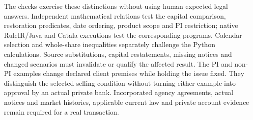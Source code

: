 The checks exercise these distinctions without using human expected legal
answers. Independent mathematical relations test the capital comparison,
restoration predicates, date ordering, product scope and PI restriction;
native RuleIR/Java and Catala executions test the corresponding programs.
Calendar selection and whole-share inequalities separately challenge the
Python calculations. Source substitutions, capital restatements, missing
notices and changed scenarios must invalidate or qualify the affected result.
The PI and non-PI examples change declared client premises while holding the
issue fixed. They distinguish the selected selling condition without turning
either example into approval by an actual private bank. Incorporated agency
agreements, actual notices and market histories, applicable current law and
private account evidence remain required for a real transaction.
